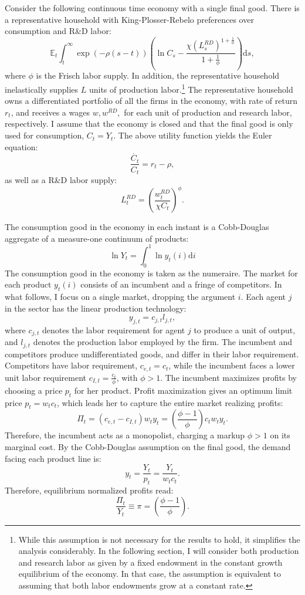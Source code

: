Consider the following continuous time economy with a single final
good. There is a representative household with King-Plosser-Rebelo
preferences over consumption and R\&D labor: 
\begin{equation}
\mathbb{E}_{t}\int_{t}^{\infty}\exp\left(-\rho\left(s-t\right)\right)\left(\ln C_{s}-\frac{\chi\left(L_{s}^{RD}\right)^{1+\frac{1}{\phi}}}{1+\frac{1}{\phi}}\right)\mathrm{d}s,\label{eq:Utility}
\end{equation}
where $\phi$ is the Frisch labor supply. In addition, the representative
household inelastically supplies $L$ units of production labor.\footnote{While this assumption is not necessary for the results to hold, it
simplifies the analysis considerably. In the following section, I
will consider both production and research labor as given by a fixed
endowment in the constant growth equilibrium of the economy. In that
case, the assumption is equivalent to assuming that both labor endowments
grow at a constant rate.} The representative household owns a differentiated portfolio of all
the firms in the economy, with rate of return $r_{t}$, and receives
a wages $w,w^{RD},$ for each unit of production and research labor,
respectively. I assume that the economy is closed and that the final
good is only used for consumption, $C_{t}=Y_{t}$. The above utility
function yields the Euler equation:
\[
\frac{\dot{C_{t}}}{C_{t}}=r_{t}-\rho,
\]
as well as a R\&D labor supply:
\[
L_{t}^{RD}=\left(\frac{w_{t}^{RD}}{\chi C_{t}}\right)^{\phi}.
\]

The consumption good in the economy in each instant is a Cobb-Douglas
aggregate of a measure-one continuum of products:
\begin{equation}
\ln Y_{t}=\int_{0}^{1}\ln y_{t}(i)\mathrm{d}i\label{eq:Y}
\end{equation}
The consumption good in the economy is taken as the numeraire. The
market for each product $y_{t}(i)$ consists of an incumbent and a
fringe of competitors. In what follows, I focus on a single market,
dropping the argument $i$. Each agent $j$ in the sector has the
linear production technology:
\[
y_{j,t}=c_{j,t}l_{j,t},
\]
where $c_{j,t}$ denotes the labor requirement for agent $j$ to produce
a unit of output, and $l_{j,t}$ denotes the production labor employed
by the firm. The incumbent and competitors produce undifferentiated
goods, and differ in their labor requirement. Competitors have labor
requirement, $c_{e,t}=c_{t}$, while the incumbent faces a lower unit
labor requirement $c_{I,t}=\frac{c_{t}}{\phi}$, with $\phi>1$. The
incumbent maximizes profits by choosing a price $p_{t}$ for her product.
Profit maximization gives an optimum limit price $p_{t}=w_{t}c_{t}$,
which leads her to capture the entire market realizing profits:
\[
\Pi_{t}=\left(c_{e,t}-c_{I,t}\right)w_{t}y_{t}=\left(\frac{\phi-1}{\phi}\right)c_{t}w_{t}y_{t}.
\]
Therefore, the incumbent acts as a monopolist, charging a markup $\phi>1$
on its marginal cost. By the Cobb-Douglas assumption on the final
good, the demand facing each product line is:
\[
y_{t}=\frac{Y_{t}}{p_{t}}=\frac{Y_{t}}{w_{t}c_{t}}.
\]
Therefore, equilibrium normalized profits read:
\[
\frac{\Pi_{t}}{Y_{t}}\equiv\pi=\left(\frac{\phi-1}{\phi}\right).
\]



